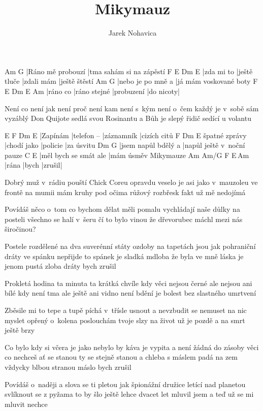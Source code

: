 \documentclass{song}
\author{Jarek Nohavica}
\title{Mikymauz}
\begin{document}
\begin{multicols}{2}

\strophe
Am                G
|Ráno mě probouzí |tma sahám si na zápěstí
F          E            Dm         E
|zda mi to |ještě tluče |zdali mám |ještě štěstí
Am                G
|nebo je po mně a |já mám voskované boty
F        E            Dm         E         Am
|ráno co |ráno stejné |probuzení |do nicoty|
\endstrophe

\strophe*
Není co není jak není proč není kam
není s~kým není o~čem každý je v~sobě sám
vyzáblý Don Quijote sedlá svou Rosinantu
a Bůh je slepý řidič sedící u volantu
\endstrophe

E        F           Dm         E
|Zapínám |telefon -- |záznamník |cizích citů
              F           Dm       E
špatné zprávy |chodí jako |policie |za úsvitu
Dm                  G\7
|jsem napůl bdělý a |napůl ještě v~noční pauze
C                     E
|měl bych se smát ale |mám úsměv Mikymauze
Am    Am/G  F      E\,Am
|rána |bych |zrušil|
\endstrophe

\strophe*
Dobrý muž v~rádiu pouští Chick Coreu
opravdu veselo je asi jako v~mauzoleu
ve frontě na mumii mám kruhy pod očima
růžový rozbřesk fakt už mě nedojímá
\endstrophe

\strophe*
Povídáš něco o~tom co bychom dělat měli
pomalu vychládají naše důlky na posteli
všechno se halí v~šeru čí to bylo vinou
že dřevorubec máchl mezi nás širočinou?
\endstrophe

Postele rozdělené na dva suverénní státy
ozdoby na tapetách jsou jak pohraniční dráty
ve spánku nepřijde to spánek je sladká mdloba
že byla ve mně láska je jenom pustá zloba
dráty bych zrušil
\endstrophe

\strophe*
Prokletá hodina ta minuta ta krátká chvíle
kdy věci nejsou černé ale nejsou ani bílé
kdy není tma ale ještě ani vidno není
bdění je bolest bez slastného umrtvení
\endstrophe

\strophe*
Zběsile mi to tepe a tupě píchá v~třísle
usnout a nevzbudit se nemuset na nic myslet
opřený o~kolena poslouchám tvoje slzy
na život už je pozdě a na smrt ještě brzy
\endstrophe

Co bylo kdy si včera je jako nebylo by
káva je vypita a není žádná do zásoby
věci co nechceš ať se stanou ty se stejně stanou
a chleba s máslem padá na zem vždycky blbou stranou
máslo bych zrušil
\endstrophe

\strophe*
Povídáš o~naději a slova se ti pletou
jak špionážní družice letící nad planetou
svlíknout se z pyžama to by šlo ještě lehce
dvacet let mluvil jsem a teď už se mi mluvit nechce
\endstrophe


\end{multicols}
\end{document}
